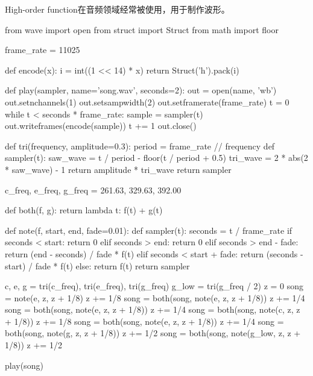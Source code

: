       High-order function在音频领域经常被使用，用于制作波形。
      \begin{codeblock}[language=python, caption={mario}]
        from wave import open
        from struct import Struct
        from math import floor

        frame_rate = 11025

        def encode(x):
            i = int((1 << 14) * x)
            return Struct('h').pack(i)

        def play(sampler, name='song.wav', seconds=2):
            out = open(name, 'wb')
            out.setnchannels(1)
            out.setsampwidth(2)
            out.setframerate(frame_rate)
            t = 0
            while t < seconds * frame_rate:
                sample = sampler(t)
                out.writeframes(encode(sample))
                t += 1
            out.close()

        def tri(frequency, amplitude=0.3):
            period = frame_rate // frequency
            def sampler(t):
                saw_wave = t / period - floor(t / period + 0.5)
                tri_wave = 2 * abs(2 * saw_wave) - 1
                return amplitude * tri_wave
            return sampler

        c_freq, e_freq, g_freq = 261.63, 329.63, 392.00

        def both(f, g):
            return lambda t: f(t) + g(t)

        def note(f, start, end, fade=0.01):
            def sampler(t):
                seconds = t / frame_rate
                if seconds < start:
                    return 0
                elif seconds > end:
                    return 0
                elif seconds > end - fade:
                    return (end - seconds) / fade * f(t)
                elif seconds < start + fade:
                    return (seconds - start) / fade * f(t)
                else:
                    return f(t)
            return sampler

        c, e, g = tri(c_freq), tri(e_freq), tri(g_freq)
        g_low = tri(g_freq / 2)
        z = 0
        song = note(e, z, z + 1/8)
        z += 1/8
        song = both(song, note(e, z, z + 1/8))
        z += 1/4
        song = both(song, note(e, z, z + 1/8))
        z += 1/4
        song = both(song, note(c, z, z + 1/8))
        z += 1/8
        song = both(song, note(e, z, z + 1/8))
        z += 1/4
        song = both(song, note(g, z, z + 1/8))
        z += 1/2
        song = both(song, note(g_low, z, z + 1/8))
        z += 1/2

        play(song)
      \end{codeblock}

